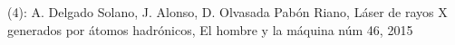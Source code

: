 \documentclass[preview]{standalone}
\begin{document}
\begin{center}
(4): A. Delgado Solano, J. Alonso, D. Olvasada Pabón Riano, Láser de rayos X generados por átomos hadrónicos, El hombre y la máquina núm 46, 2015
\end{center}
\end{document}
